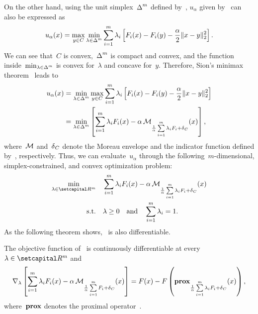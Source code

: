 \documentclass[../../main]{subfiles}
\begin{document}
On the other hand, using the unit simplex~$\operatorname{\Delta}^m$ defined by~, $u_\alpha$ given by~ can also be expressed as
\begin{equation}
    u_\alpha(x) = \max_{y \in C} \min_{\lambda \in \operatorname{\Delta}^m} \sum_{i = 1}^{m} \lambda_i \left[ F_i(x) - F_i(y) - \frac{\alpha}{2} \lVert x - y\rVert_2^2 \right] 
.\end{equation} 
We can see that~$C$ is convex,~$\operatorname{\Delta}^m$ is compact and convex, and the function inside~$\min_{\lambda \in \operatorname{\Delta}^m}$ is convex for~$\lambda$ and concave for~$y$.
Therefore, Sion's minimax theorem~\cite{Sion1958} leads to
\begin{equation} \label{eq:u dual}
    \begin{split}
        u_\alpha(x) &= \min_{\lambda \in \operatorname{\Delta}^m} \max_{y \in C} \sum_{i = 1}^{m} \lambda_i \left[ F_i(x) - F_i(y) - \frac{\alpha}{2} \lVert x - y\rVert_2^2 \right] \\
                  &= \min_{\lambda \in \operatorname{\Delta}^m} \left[ \sum_{i = 1}^{m} \lambda_i F_i(x) - \alpha \operatorname{\mathcal{M}}_{\frac{1}{\alpha} \sum\limits_{i = 1}^{m} \lambda_i F_i + \operatorname{\delta}_C} (x) \right]
    ,\end{split}
\end{equation}
where~$\operatorname{\mathcal{M}}$ and~$\operatorname{\delta}_C$ denote the Moreau envelope and the indicator function defined by~, respectively.
Thus, we can evaluate~$u_\alpha$ through the following~$m$-dimensional, simplex-constrained, and convex optimization problem:
\begin{equation} \label{eq:dual_reg_gap}
    \begin{aligned}
        \min_{\lambda \in \setR^m} &&& \sum_{i = 1}^{m} \lambda_i F_i(x) - \alpha \envelope_{\frac{1}{\alpha} \sum\limits_{i = 1}^{m} \lambda_i F_i + \indicator_C}(x) \\
        \st &&& \lambda \ge 0 \eqand \sum_{i = 1}^{m} \lambda_i = 1 
    .\end{aligned}
\end{equation} 
As the following theorem shows,~ is also differentiable.
\begin{theorem} 
    The objective function of~ is continuously differentiable at every~$\lambda \in \setR^m$ and
    \begin{equation}
        \nabla_\lambda \left[ \sum_{i = 1}^{m} \lambda_i F_i(x) - \alpha \operatorname{\mathcal{M}}_{\frac{1}{\alpha} \sum\limits_{i = 1}^{m} F_i + \operatorname{\delta}_C}(x) \right] = F(x) - F\left( \operatorname{\mathbf{prox}}_{\frac{1}{\alpha} \sum\limits_{i = 1}^{m} \lambda_i F_i + \operatorname{\delta}_C}(x) \right)
    ,\end{equation} 
    where~$\operatorname{\mathbf{prox}}$ denotes the proximal operator~.
\end{theorem}
\end{document}
